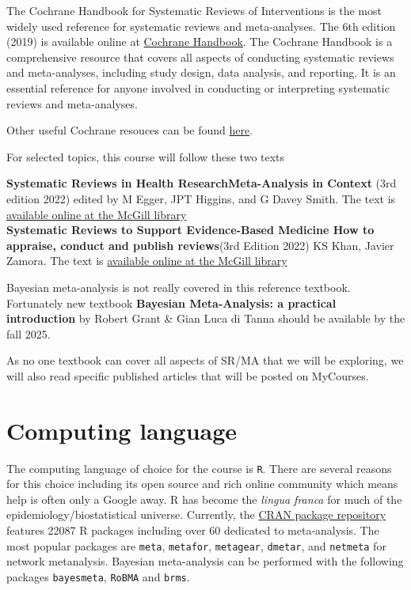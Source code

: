 \documentclass[
  letterpaper,
  DIV=11,
  numbers=noendperiod]{scrartcl}
\begin{document}
The Cochrane Handbook for Systematic Reviews of Interventions is the
most widely used reference for systematic reviews and meta-analyses. The
6th edition (2019) is available online at
\href{https://training.cochrane.org/handbook/current}{Cochrane
Handbook}. The Cochrane Handbook is a comprehensive resource that covers
all aspects of conducting systematic reviews and meta-analyses,
including study design, data analysis, and reporting. It is an essential
reference for anyone involved in conducting or interpreting systematic
reviews and meta-analyses.~

Other useful Cochrane resouces can be found
\href{https://training.cochrane.org/resources}{here}.~~

For selected topics, this course will follow these two texts~

\textbf{Systematic Reviews in Health ResearchMeta-Analysis in Context}
(3rd edition 2022) edited by M Egger, JPT Higgins, and G Davey Smith.
The text is
\href{https://onlinelibrary-wiley-com.proxy3.library.mcgill.ca/doi/book/10.1002/9781119099369}{available
online at the McGill library} ~~\\
\textbf{Systematic Reviews to Support Evidence-Based Medicine How to
appraise, conduct and publish reviews}(3rd Edition 2022) KS Khan, Javier
Zamora. The text is
\href{https://www-taylorfrancis-com.proxy3.library.mcgill.ca/books/edit/10.1201/9781003220039/systematic-reviews-support-evidence-based-medicine-khalid-saeed-khan-javier-zamora}{available
online at the McGill library} ~~

Bayesian meta-analysis is not really covered in this reference textbook.
Fortunately new textbook \textbf{Bayesian Meta-Analysis: a practical
introduction} by Robert Grant \& Gian Luca di Tanna should be available
by the fall 2025.~~

As no one textbook can cover all aspects of SR/MA that we will be
exploring, we will also read specific published articles that will be
posted on MyCourses.

\section{Computing language}\label{computing-language}

The computing language of choice for the course is \texttt{R}. There are
several reasons for this choice including its open source and rich
online community which means help is often only a Google away. R has
become the \emph{lingua franca} for much of the
epidemiology/biostatistical universe. Currently, the
\href{https://cran.r-project.org}{CRAN package repository} features
22087 R packages including over 60 dedicated to meta-analysis. The most
popular packages are \texttt{meta}, \texttt{metafor}, \texttt{metagear},
\texttt{dmetar}, and \texttt{netmeta} for network metanalysis. Bayesian
meta-analysis can be performed with the following packages
\texttt{bayesmeta}, \texttt{RoBMA} and \texttt{brms}. ~
\end{document}
